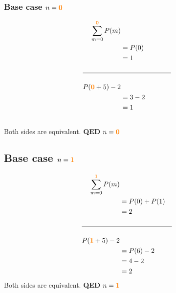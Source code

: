 \documentclass[11pt]{article}
\def \subsorange [#1]{\mathbf{\textcolor{orange}{#1}}}
\begin{document}
\begin{table}[h]
   \begin{subtable}[h]{0.45\textwidth}
      \subsubsection*{Base case $n=\subsorange[0]$}
      \begin{alignat*}{2}
         \sum_{m=0}^{\subsorange[0]}P(m) \\
         &=P(0) &\phantom{+P(1)} \\
         &=1 \\
         \\ \hline \\
         P(\subsorange[0]+5)-2 \\
         &=3-2 \\
         &=1 \\
         &\phantom{=1}
      \end{alignat*}
      Both sides are equivalent. \textbf{QED} $n=\subsorange[0]$
   \end{subtable}
   \hfill
   \begin{subtable}[h]{0.45\textwidth}
      \subsection*{Base case $n=\subsorange[1]$}
      \begin{alignat*}{2}
         \sum_{m=0}^{\subsorange[1]}P(m) \\
         &=P(0)+P(1) \\
         &=2 \\
         \\ \hline \\
         P(\subsorange[1]+5)-2 \\
         &=P(6)-2 \\
         &=4-2 \\
         &=2
      \end{alignat*}
      Both sides are equivalent. \textbf{QED} $n=\subsorange[1]$
   \end{subtable}
\end{table}

\pagebreak
\end{document}

